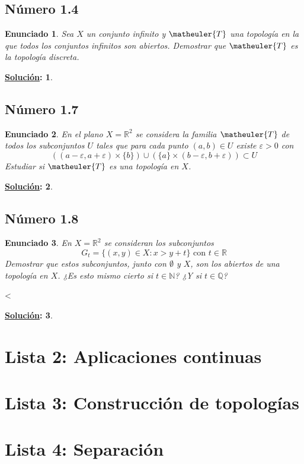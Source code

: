 \documentclass[10pt,a4paper,openright]{book}
\theoremstyle{break}
\newtheorem*{enun}{Enunciado}
\newtheorem*{ej}{\underline{Solución}:}
\begin{document}
\section{Número 1.4}
\begin{enun}
Sea $X$ un conjunto infinito y $\matheuler{T}$ una topología en la que todos los conjuntos infinitos son abiertos. Demostrar que $\matheuler{T}$ es la topología discreta.
\end{enun}
\begin{ej}
\end{ej}

\section{Número 1.7}
\begin{enun}
En el plano $X = \mathbb{R}^2$ se considera la familia $\matheuler{T}$ de todos los subconjuntos $U$ tales que para cada punto $(a,b) \in U$ existe $\varepsilon > 0$ con 
$$((a - \varepsilon, a + \varepsilon) \times \{b\}) \cup (\{a\} \times (b-\varepsilon, b + \varepsilon)) \subset U$$
Estudiar si $\matheuler{T}$  es una topología en $X$.
\end{enun}
\begin{ej}
\end{ej}

\section{Número 1.8}
\begin{enun}
En $X = \mathbb{R}^2$ se consideran los subconjuntos $$G_t = \{(x,y) \in X : x > y + t\} \mbox{ con } t \in \mathbb{R}$$
Demostrar que estos subconjuntos, junto con $\emptyset$ y $X$, son los abiertos de una topología en $X$. ¿Es esto mismo cierto si $t \in \mathbb{N}$? ¿Y si $t \in \mathbb{Q}$?
\end{enun}<
\begin{ej}
\end{ej}
\chapter{Lista 2: Aplicaciones continuas}%
\label{cha:lista2}

\chapter{Lista 3: Construcción de topologías}%
\label{cha:lista3}

\chapter{Lista 4: Separación}%
\label{cha:lista4}
\end{document}
